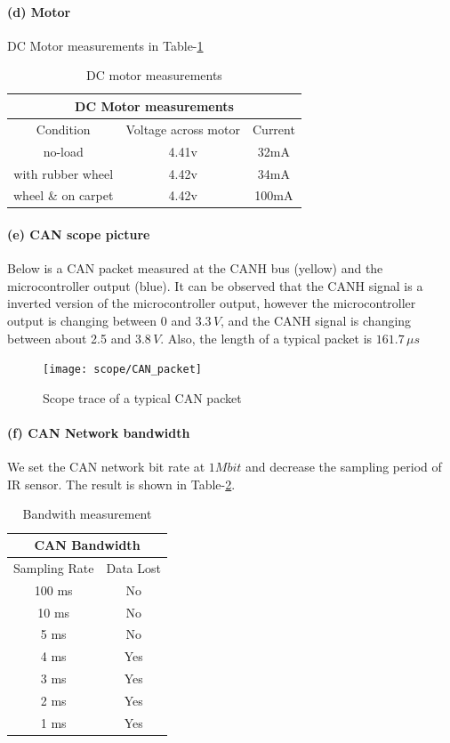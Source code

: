 \documentclass[a4paper]{article}
\newlength{\pic}
\begin{document}
\paragraph{(d) Motor} DC Motor measurements in Table-\ref{tab3}
\begin{table}
\center
  \begin{tabular}{|c|c|c|}
    \hline
    \multicolumn{3}{|c|}{DC Motor measurements} \\
    \hline
    Condition & Voltage across motor & Current \\
    \hline
	no-load				&	4.41v &	32mA \\
	with rubber wheel	&	4.42v &	34mA \\
	wheel \& on carpet	&   4.42v & 100mA \\
    \hline
  \end{tabular}
  \caption{DC motor measurements}
  \label{tab3}
\end{table}


\paragraph{(e) CAN scope picture} Below is a CAN packet measured at the CANH bus (yellow) and the microcontroller output (blue). It can be observed that the CANH signal is a inverted version of the microcontroller output, however the 
microcontroller output is changing between 0 and $3.3 \, V$, and the CANH signal is changing between about 2.5 and $3.8 \, V$.
Also, the length of a typical packet is $ 161.7 \, \mu s $

\setlength{\pic}{0.8\textwidth}
\begin{figure}[htp]
\center
\texttt{[image: scope/CAN\_packet]}
\caption{Scope trace of a typical CAN packet}
\label{trace}
\end{figure}


\paragraph{(f) CAN Network bandwidth} We set the CAN network bit rate at $ 1 Mbit $ and decrease the sampling period of
IR sensor. The result is shown in Table-\ref{tab4}.

\begin{table}
\center
  \begin{tabular}{|c|c|}
    \hline
    \multicolumn{2}{|c|}{CAN Bandwidth} \\
    \hline
    Sampling Rate  & Data Lost \\
    \hline
	100 ms &   No \\
	10 ms  &   No \\
	5 ms   &   No \\
	4 ms   &   Yes \\
	3 ms   &   Yes \\
	2 ms   &   Yes \\
	1 ms   &   Yes \\
    \hline
  \end{tabular}
  \caption{Bandwith measurement}
  \label{tab4}
\end{table}
\end{document}
